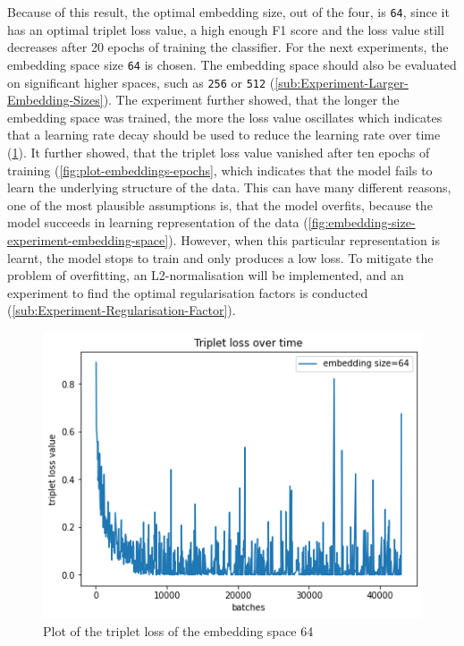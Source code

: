 \newline
\newline
\noindent
Because of this result, the optimal embedding size, out of the four, is \texttt{64}, since it has an optimal triplet loss value, a high enough F1 score and the loss value still decreases after 20 epochs of training the classifier. For the next experiments, the embedding space size \texttt{64} is chosen. The embedding space should also be evaluated on significant higher spaces, such as \texttt{256} or \texttt{512} (\ref{sub:Experiment-Larger-Embedding-Sizes}).
\newline
\newline
The experiment further showed, that the longer the embedding space was trained, the more the loss value oscillates which indicates that a learning rate decay should be used to reduce the learning rate over time (\ref{fig:plot-triplet-64}). It further showed, that the triplet loss value vanished after ten epochs of training (\ref{fig:plot-embeddings-epochs}, which indicates that the model fails to learn the underlying structure of the data. This can have many different reasons, one of the most plausible assumptions is, that the model overfits, because the model succeeds in learning representation of the data (\ref{fig:embedding-size-experiment-embedding-space}). However, when this particular representation is learnt, the model stops to train and only produces a low loss. To mitigate the problem of overfitting, an L2-normalisation will be implemented, and an experiment to find the optimal regularisation factors is conducted (\ref{sub:Experiment-Regularisation-Factor}).
\begin{figure}[htb]
\centering
    \includegraphics[width=0.4\linewidth]{study-doc/experiment_embedding_size/assets/plot_triplet_loss.png}
    \caption{Plot of the triplet loss of the embedding space 64}
    \label{fig:plot-triplet-64}
\end{figure}

